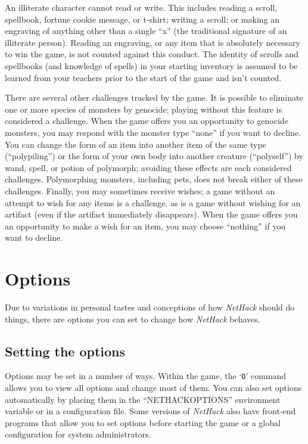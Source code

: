 An illiterate character cannot read or write.  This includes reading
a scroll, spellbook, fortune cookie message, or t-shirt; writing a
scroll; or making an engraving of anything other than a single ``x'' (the
traditional signature of an illiterate person).  Reading an engraving,
or any item that is absolutely necessary to win the game, is not counted
against this conduct.  The identity of scrolls and spellbooks (and
knowledge of spells) in your starting inventory is assumed to be
learned from your teachers prior to the start of the game and isn't
counted.

There are several other challenges tracked by the game.  It is possible
to eliminate one or more species of monsters by genocide; playing without
this feature is considered a challenge.  When the game offers you an
opportunity to genocide monsters, you may respond with the monster type
``none'' if you want to decline.  You can change the form of an item into
another item of the same type (``polypiling'') or the form of your own
body into another creature (``polyself'') by wand, spell, or potion of
polymorph; avoiding these effects are each considered challenges.
Polymorphing monsters, including pets, does not break either of these
challenges.
Finally, you may sometimes receive wishes; a game without an attempt to
wish for any items is a challenge, as is a game without wishing for
an artifact (even if the artifact immediately disappears).  When the
game offers you an opportunity to make a wish for an item, you may
choose ``nothing'' if you want to decline.

\section{Options}

Due to variations in personal tastes and conceptions of how {\it NetHack\/}
should do things, there are options you can set to change how {\it NetHack\/}
behaves.

\subsection*{Setting the options}

Options may be set in a number of ways.  Within the game, the `{\tt O}'
command allows you to view all options and change most of them.
You can also set options automatically by placing them in the
``NETHACKOPTIONS'' environment variable or in a configuration file.
Some versions of {\it NetHack\/} also have front-end programs that allow
you to set options before starting the game or a global configuration 
for system administrators.


